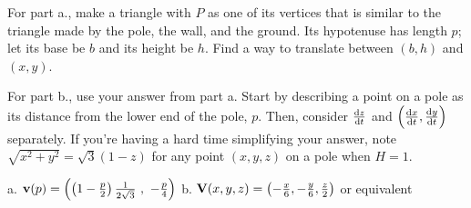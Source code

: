 \begin{hint} 
For part a., make a triangle with $P$ as one of its vertices that is similar to the triangle made by the pole, the wall, and the ground. Its hypotenuse has length $p$; let its base be $b$ and its height be $h$. Find a way to translate between $(b,h)$ and $(x,y)$.

For part b., use your answer from part a. Start by describing a point on a pole as its distance from the lower end of the pole, $p$. Then, consider $\diff{z}{t}$ and $\left(\diff{x}{t},\diff{y}{t}\right)$ separately. If you're having a hard time simplifying your answer, note  $\sqrt{x^2+y^2}=\sqrt3(1-z)$ for any point $(x,y,z)$ on a pole when $H=1$.
\end{hint}

\begin{answer} 
a. $\mathbf{v}(p)=\left( \left(1-\frac{p}{2}\right)\frac{1}{2\sqrt{3}}~,~-\frac{p}{4} \right)$\qquad
b. $\mathbf{V}(x,y,z)=\left(
-\frac{x}{6}, -\frac{y}{6},\frac{z}{2}\right)$ or equivalent
\end{answer}

